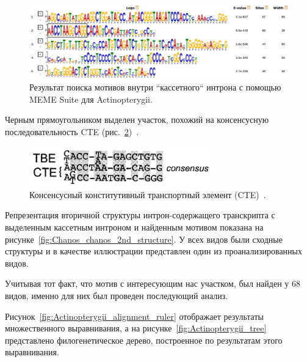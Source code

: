 \begin{figure}[h] %
    \centering
    \includegraphics[width=1.0\textwidth]{images/Actinopterygii_meme_motif}
    \caption{Результат поиска мотивов внутри ``кассетного`` интрона с помощью MEME Suite для Actinopterygii.}
    \label{fig:Actinopterygii_meme}
\end{figure}

Черным прямоугольником выделен участок, похожий на консенсусную последовательность CTE (рис.~\ref{fig:CTE_consensus})~\cite{cte_consensus}.

\begin{figure}[h] %
    \centering
    \includegraphics[width=0.7\textwidth]{images/CTE_consensus}
    \caption{Консенсусный конститутивный транспортный элемент (CTE)~\cite{cte_consensus}.}
    \label{fig:CTE_consensus}
\end{figure}

Репрезентация вторичной структуры интрон-содержащего транскрипта с выделенным кассетным интроном и найденным мотивом показана на рисунке~\ref{fig:Chanos_chanos_2nd_structure}.
У всех видов были сходные структуры и в качестве иллюстрации представлен один из проанализированных видов.

Учитывая тот факт, что мотив с интересующим нас участком, был найден у 68 видов, именно для них был проведен последующий анализ.

Рисунок~\ref{fig:Actinopterygii_alignment_ruler} отображает результаты множественного выравнивания, а на рисунке~\ref{fig:Actinopterygii_tree} представлено филогенетическое дерево, построенное по результатам этого выравнивания.

